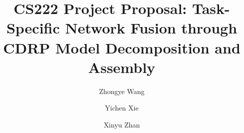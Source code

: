 \documentclass[acmsmall,nonacm]{acmart}\settopmatter{}
\begin{document}
\title[Task-Specific Network Fusion through CDRP Model Decomposition and Assembly]{CS222 Project Proposal: Task-Specific Network Fusion through CDRP Model Decomposition and Assembly}         %

\author{Zhongye Wang}

\author{Yichen Xie}

\author{Xinyu Zhan}
\end{document}
